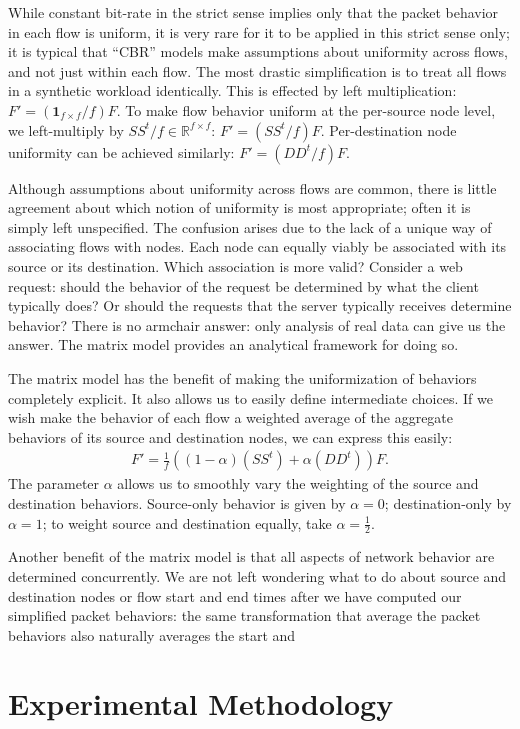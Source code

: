 \documentclass[conference]{IEEEtran}
\newcommand{\caps}[1]{{\small{#1}}}
\newcommand{\R}{\mathbb{R}}
\newcommand{\ones}[1]{\mathbf{1}_{#1}}
\begin{document}
While constant bit-rate in the strict sense implies only that the packet behavior in each flow is uniform, it is very rare for it to be applied in this strict sense only; it is typical that ``\caps{CBR}'' models make assumptions about uniformity across flows, and not just within each flow. The most drastic simplification is to treat all flows in a synthetic workload identically. This is effected by left multiplication: $F'=(\ones{f \times f}/f)F$. To make flow behavior uniform at the per-source node level, we left-multiply by $SS^t/f\in\R^{f \times f}$: $F'=(SS^t/f)F$. Per-destination node uniformity can be achieved similarly: $F'=(DD^t/f)F$.

Although assumptions about uniformity across flows are common, there is little agreement about which notion of uniformity is most appropriate; often it is simply left unspecified. The confusion arises due to the lack of a unique way of associating flows with nodes. Each node can equally viably be associated with its source or its destination. Which association is more valid? Consider a web request: should the behavior of the request be determined by what the client typically does? Or should the requests that the server typically receives determine behavior? There is no armchair answer: only analysis of real data can give us the answer. The matrix model provides an analytical framework for doing so.

The matrix model has the benefit of making the uniformization of behaviors completely explicit. It also allows us to easily define intermediate choices. If we wish make the behavior of each flow a weighted average of the aggregate behaviors of its source and destination nodes, we can express this easily:
\begin{align}
F' = \frac{1}{f}((1-\alpha)(SS^t)+\alpha(DD^t))F.
\end{align}
The parameter $\alpha$ allows us to smoothly vary the weighting of the source and destination behaviors. Source-only behavior is given by $\alpha=0$; destination-only by $\alpha=1$; to weight source and destination equally, take $\alpha=\frac{1}{2}$.

Another benefit of the matrix model is that all aspects of network behavior are determined concurrently. We are not left wondering what to do about source and destination nodes or flow start and end times after we have computed our simplified packet behaviors: the same transformation that average the packet behaviors also naturally averages the start and

\section{Experimental Methodology}\label{sec:methodology}
\end{document}
